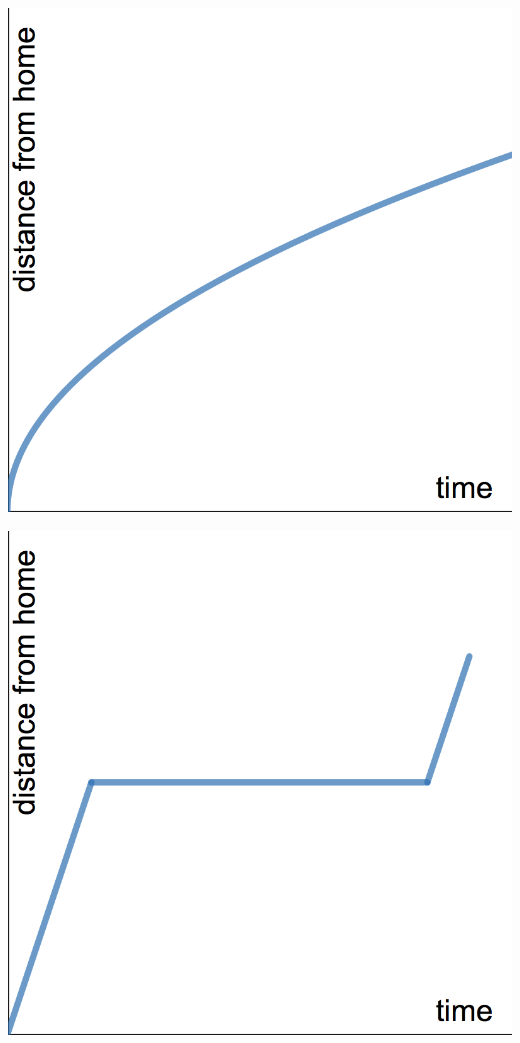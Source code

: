 \documentclass[11pt]{exam}
\theoremstyle{definition}
\begin{document}
\begin{questions}
	\begin{enumerate}[(I)]
	\begin{minipage}{.25\textwidth}
		\item \includegraphics[scale=0.1]{Figures/graph1.png}
	\end{minipage}
	\begin{minipage}{.25\textwidth}
		\item \includegraphics[scale=0.1]{Figures/graph2.png}

\end{minipage}
\end{enumerate}
\end{questions}
\end{document}
